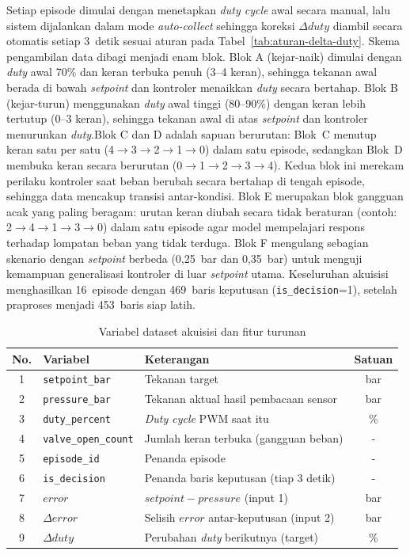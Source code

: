 Setiap episode dimulai dengan menetapkan \emph{duty cycle} awal secara
manual, lalu sistem dijalankan dalam mode \emph{auto-collect} sehingga
koreksi $\Delta duty$ diambil secara otomatis setiap 3~detik sesuai
aturan pada Tabel~\ref{tab:aturan-delta-duty}. Skema pengambilan data
dibagi menjadi enam blok. Blok A (kejar-naik) dimulai dengan
\emph{duty} awal 70\% dan keran terbuka penuh (3--4 keran), sehingga
tekanan awal berada di bawah \emph{setpoint} dan kontroler menaikkan
\emph{duty} secara bertahap. Blok B (kejar-turun) menggunakan
\emph{duty} awal tinggi (80--90\%) dengan keran lebih tertutup (0--3
keran), sehingga tekanan awal di atas \emph{setpoint} dan kontroler
menurunkan \emph{duty}.Blok C dan D adalah sapuan
berurutan: Blok~C menutup keran satu per satu (4$\to$3$\to$2$\to$1$\to$0)
dalam satu episode, sedangkan Blok~D membuka keran secara berurutan
(0$\to$1$\to$2$\to$3$\to$4). Kedua blok ini merekam perilaku kontroler
saat beban berubah secara bertahap di tengah episode, sehingga data
mencakup transisi antar-kondisi. Blok E merupakan blok gangguan
acak yang paling beragam: urutan keran diubah secara tidak beraturan (contoh:
2$\to$4$\to$1$\to$3$\to$0) dalam satu episode agar model mempelajari respons
terhadap lompatan beban yang tidak terduga. Blok F mengulang
sebagian skenario dengan \emph{setpoint} berbeda (0{,}25~bar dan
0{,}35~bar) untuk menguji kemampuan generalisasi kontroler di luar
\emph{setpoint} utama. Keseluruhan akuisisi menghasilkan 16~episode dengan
469~baris keputusan (\texttt{is\_decision}=1), setelah praproses menjadi
453~baris siap latih.

\begin{table}[H]
  \centering
  \caption{Variabel dataset akuisisi dan fitur turunan}
  \label{tab:format-dataset-akuisisi-desain}
  \begin{tabular}{|c|p{3cm}|p{5.5cm}|c|}
  \hline
  \textbf{No.} & \textbf{Variabel} & \textbf{Keterangan} & \textbf{Satuan} \\
  \hline
  1 & \texttt{setpoint\_bar} & Tekanan target & bar \\
  \hline
  2 & \texttt{pressure\_bar} & Tekanan aktual hasil pembacaan sensor & bar \\
  \hline
  3 & \texttt{duty\_percent} & \emph{Duty cycle} PWM saat itu & \% \\
  \hline
  4 & \texttt{valve\_open\_count} & Jumlah keran terbuka (gangguan beban) & - \\
  \hline
  5 & \texttt{episode\_id} & Penanda episode & - \\
  \hline
  6 & \texttt{is\_decision} & Penanda baris keputusan (tiap 3 detik) & - \\
  \hline
  7 & $error$ & $setpoint - pressure$ (input 1) & bar \\
  \hline
  8 & $\Delta error$ & Selisih $error$ antar-keputusan (input 2) & bar \\
  \hline
  9 & $\Delta duty$ & Perubahan \emph{duty} berikutnya (target) & \% \\
  \hline
  \end{tabular}
\end{table}

